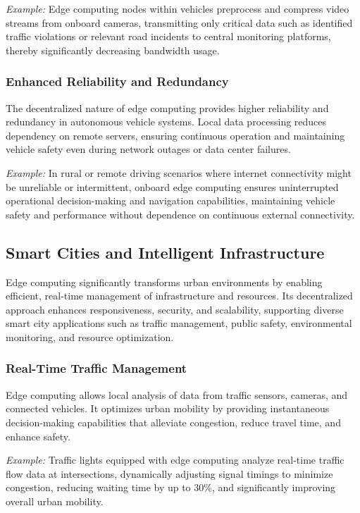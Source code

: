 \documentclass[runningheads]{llncs}
\begin{document}
\textit{Example:} Edge computing nodes within vehicles preprocess and compress video streams from onboard cameras, transmitting only critical data such as identified traffic violations or relevant road incidents to central monitoring platforms, thereby significantly decreasing bandwidth usage.

\subsubsection{Enhanced Reliability and Redundancy}
The decentralized nature of edge computing provides higher reliability and redundancy in autonomous vehicle systems. Local data processing reduces dependency on remote servers, ensuring continuous operation and maintaining vehicle safety even during network outages or data center failures.

\textit{Example:} In rural or remote driving scenarios where internet connectivity might be unreliable or intermittent, onboard edge computing ensures uninterrupted operational decision-making and navigation capabilities, maintaining vehicle safety and performance without dependence on continuous external connectivity.

\subsection{Smart Cities and Intelligent Infrastructure}

Edge computing significantly transforms urban environments by enabling efficient, real-time management of infrastructure and resources. Its decentralized approach enhances responsiveness, security, and scalability, supporting diverse smart city applications such as traffic management, public safety, environmental monitoring, and resource optimization.

\subsubsection{Real-Time Traffic Management}
Edge computing allows local analysis of data from traffic sensors, cameras, and connected vehicles. It optimizes urban mobility by providing instantaneous decision-making capabilities that alleviate congestion, reduce travel time, and enhance safety.

\textit{Example:} Traffic lights equipped with edge computing analyze real-time traffic flow data at intersections, dynamically adjusting signal timings to minimize congestion, reducing waiting time by up to 30\%, and significantly improving overall urban mobility.
\end{document}
